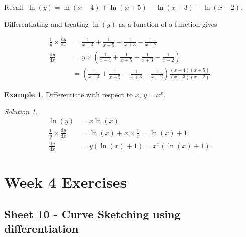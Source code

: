 \documentclass[
  english,
  11pt,
  oneside]{book}
\newcommand{\slide}{}
\theoremstyle{definition}
\theoremstyle{definition}
\newtheorem{example}{Example}[chapter]
\theoremstyle{definition}
\theoremstyle{definition}
\theoremstyle{remark}
\newtheorem*{solution}{Solution}
\begin{document}
\slide

\begin{slidesonly}

Recall: \(\ln(y) = \ln(x-4)+\ln(x+5)-\ln(x+3)-\ln(x-2)\).

\end{slidesonly}

Differentiating and treating \(\ln(y)\) as a function of a function gives

\begin{notslides}

\begin{align*}
\frac 1y\times\frac{\mathrm{d} y}{\mathrm{d} x} &= \frac{1}{x-4}+\frac{1}{x+5}-\frac{1}{x+3}-\frac{1}{x-2}\\
\frac{\mathrm{d} y}{\mathrm{d} x} &= y\times\left(\frac{1}{x-4}+\frac{1}{x+5}-\frac{1}{x+3}-\frac{1}{x-2}\right)\\
&= \left(\frac{1}{x-4}+\frac{1}{x+5}-\frac{1}{x+3}-\frac{1}{x-2}\right)\frac{(x-4)(x+5)}{(x+3)(x-2)}.
\end{align*}

\end{notslides}

\begin{slidesonly}

\slide

\end{slidesonly}

\begin{example}
Differentiate with respect to \(x\), \(y=x^x\).
\end{example}

\begin{solution}
\begin{align*}
\ln(y) &= x\ln(x)\\
\frac{1}{y}\times\frac{\mathrm{d} y}{\mathrm{d} x} &= \ln(x)+x\times\frac{1}{x} = \ln(x)+1\\
\frac{\mathrm{d} y}{\mathrm{d} x} &= y(\ln(x)+1) = x^x(\ln(x)+1).
\end{align*}
\end{solution}

\chapter*{Week 4 Exercises}\label{week-4-exercises}

\section{Sheet 10 - Curve Sketching using differentiation}\label{sheet-10---curve-sketching-using-differentiation}
\end{document}
